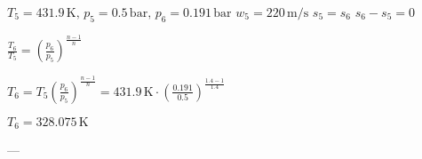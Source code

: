 \( T_5 = 431.9 \, \text{K}, \, p_5 = 0.5 \, \text{bar}, \, p_6 = 0.191 \, \text{bar} \)  
\( w_5 = 220 \, \text{m/s} \)  
\( s_5 = s_6 \)  
\( s_6 - s_5 = 0 \)  

\( \frac{T_6}{T_5} = \left( \frac{p_6}{p_5} \right)^{\frac{n-1}{n}} \)  

\( T_6 = T_5 \left( \frac{p_6}{p_5} \right)^{\frac{n-1}{n}} = 431.9 \, \text{K} \cdot \left( \frac{0.191}{0.5} \right)^{\frac{1.4-1}{1.4}} \)  

\( T_6 = 328.075 \, \text{K} \)  

---